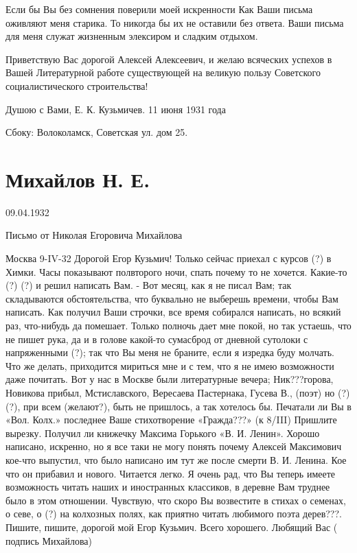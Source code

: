 \documentclass[]{memoir}
\begin{document}
Если бы Вы без сомнения поверили моей искренности Как Ваши письма оживляют меня старика. То никогда бы их не оставили без ответа. Ваши письма для меня служат жизненным элексиром и сладким отдыхом. 

Приветствую Вас дорогой Алексей Алексеевич, и желаю всяческих успехов в Вашей Литературной работе существующей на великую пользу Советского социалистического строительства!

Душою с Вами, Е. К. Кузьмичев. 11 июня 1931 года

Сбоку: Волоколамск, Советская ул. дом 25.

\section{Михайлов Н. Е.}

09.04.1932

Письмо от Николая Егоровича Михайлова 

Москва 9-IV-32
Дорогой Егор Кузьмич!
Только сейчас приехал с курсов (?) в Химки. Часы показывают полвторого ночи, спать почему то не хочется. Какие-то (?) (?) и решил написать Вам. - 
Вот месяц, как я не писал Вам; так складываются обстоятельства, что буквально не выберешь времени, чтобы Вам написать. Как получил Ваши строчки, все время собирался написать, но всякий раз, что-нибудь да помешает.
Только полночь дает мне покой, но так устаешь, что не пишет рука, да и в голове какой-то сумасброд от дневной сутолоки с напряженными (?); так  что Вы меня не браните, если я изредка буду молчать. 
Что же делать, приходится мириться мне и с тем, что я не имею возможности даже почитать. Вот  у нас в Москве были литературные вечера; Ник???горова, Новикова прибыл, Мстиславского, Вересаева Пастернака, Гусева В., (поэт) но (?) (?), при всем (желают?), быть не пришлось, а так хотелось бы.
Печатали ли Вы в «Вол. Колх.» последнее Ваше стихотворение «Гражда???» (к 8/III) Пришлите вырезку. Получил ли книжечку Максима Горького «В. И. Ленин». Хорошо написано, искренно, но я все таки не могу понять почему Алексей Максимович кое-что  выпустил, что было написано им тут же после смерти В. И. Ленина. Кое что он прибавил и нового. Читается легко. Я очень рад, что Вы теперь имеете возможность читать наших и иностранных классиков, в деревне Вам труднее было в этом отношении.
Чувствую, что скоро Вы возвестите в стихах о семенах, о севе, о (?) на колхозных полях, как приятно читать любимого поэта дерев???. 
Пишите, пишите, дорогой мой Егор Кузьмич.
Всего хорошего.
Любящий Вас ( подпись Михайлова)
\end{document}
